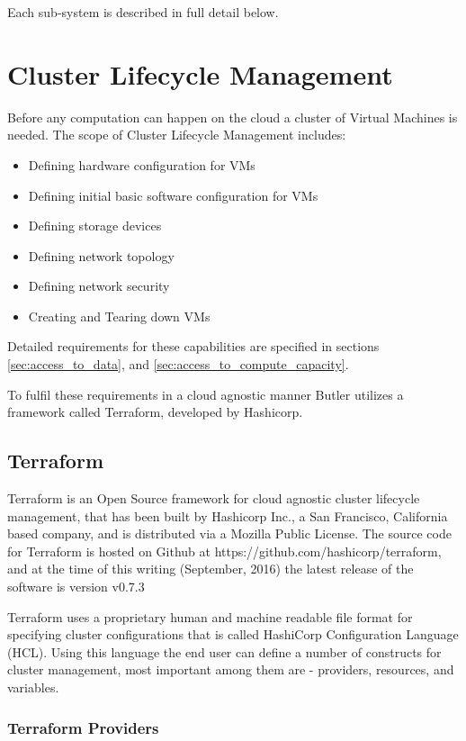 Each sub-system is described in full detail below.

\section{Cluster Lifecycle Management}

Before any computation can happen on the cloud a cluster of Virtual Machines is needed. The scope of Cluster Lifecycle Management includes:

\begin{itemize}
\item Defining hardware configuration for VMs
\item Defining initial basic software configuration for VMs
\item Defining storage devices
\item Defining network topology
\item Defining network security
\item Creating and Tearing down VMs
\end{itemize}

Detailed requirements for these capabilities are specified in sections \ref{sec:access_to_data}, and \ref{sec:access_to_compute_capacity}.

To fulfil these requirements in a cloud agnostic manner Butler utilizes a framework called Terraform, developed by Hashicorp.

\subsection{Terraform}\label{sec:terraform_design}

Terraform is an Open Source framework for cloud agnostic cluster lifecycle management, that has been built by Hashicorp Inc., a San Francisco, California based company, and is distributed via a Mozilla Public License. The source code for Terraform is hosted on Github at https://github.com/hashicorp/terraform, and at the time of this writing (September, 2016) the latest release of the software is version v0.7.3

Terraform uses a proprietary human and machine readable file format for specifying cluster configurations that is called HashiCorp Configuration Language (HCL). Using this language the end user can define a number of constructs for cluster management, most important among them are - providers, resources, and variables.

\subsubsection {Terraform Providers}

